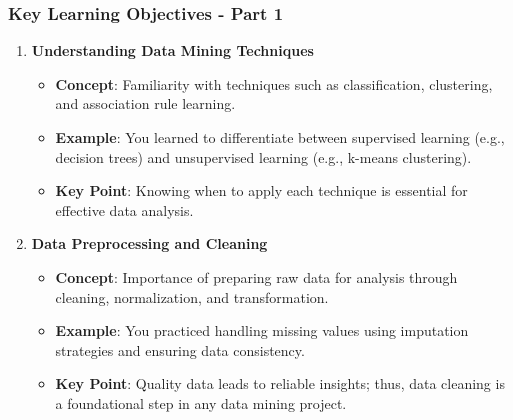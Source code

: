 \documentclass[aspectratio=169]{beamer}
\begin{document}
\begin{frame}[fragile]
    \frametitle{Key Learning Objectives - Part 1}
    \begin{enumerate}
        \item \textbf{Understanding Data Mining Techniques}
        \begin{itemize}
            \item \textbf{Concept}: Familiarity with techniques such as classification, clustering, and association rule learning.
            \item \textbf{Example}: You learned to differentiate between supervised learning (e.g., decision trees) and unsupervised learning (e.g., k-means clustering).
            \item \textbf{Key Point}: Knowing when to apply each technique is essential for effective data analysis.
        \end{itemize}
        
        \item \textbf{Data Preprocessing and Cleaning}
        \begin{itemize}
            \item \textbf{Concept}: Importance of preparing raw data for analysis through cleaning, normalization, and transformation.
            \item \textbf{Example}: You practiced handling missing values using imputation strategies and ensuring data consistency.
            \item \textbf{Key Point}: Quality data leads to reliable insights; thus, data cleaning is a foundational step in any data mining project.
        \end{itemize}
    \end{enumerate}
\end{frame}
\end{document}
